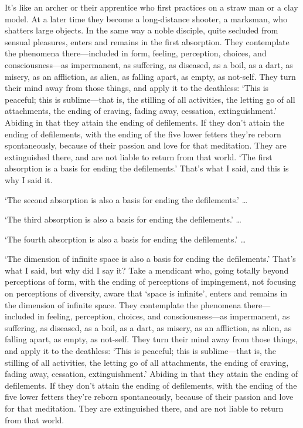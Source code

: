 \documentclass[12pt,openany]{book}%
\begin{document}
It’s like an archer or their apprentice who first practices on a straw man or a clay model. At a later time they become a long-distance shooter, a marksman, who shatters large objects. In the same way a noble disciple, quite secluded from sensual pleasures, enters and remains in the first absorption. They contemplate the phenomena there—included in form, feeling, perception, choices, and consciousness—as impermanent, as suffering, as diseased, as a boil, as a dart, as misery, as an affliction, as alien, as falling apart, as empty, as not-self. They turn their mind away from those things, and apply it to the deathless: ‘This is peaceful; this is sublime—that is, the stilling of all activities, the letting go of all attachments, the ending of craving, fading away, cessation, extinguishment.’ Abiding in that they attain the ending of defilements. If they don’t attain the ending of defilements, with the ending of the five lower fetters they’re reborn spontaneously, because of their passion and love for that meditation. They are extinguished there, and are not liable to return from that world. ‘The first absorption is a basis for ending the defilements.’ That’s what I said, and this is why I said it. 

‘The second absorption is also a basis for ending the defilements.’ … 

‘The third absorption is also a basis for ending the defilements.’ … 

‘The fourth absorption is also a basis for ending the defilements.’ … 

‘The dimension of infinite space is also a basis for ending the defilements.’ That’s what I said, but why did I say it? Take a mendicant who, going totally beyond perceptions of form, with the ending of perceptions of impingement, not focusing on perceptions of diversity, aware that ‘space is infinite’, enters and remains in the dimension of infinite space. They contemplate the phenomena there—included in feeling, perception, choices, and consciousness—as impermanent, as suffering, as diseased, as a boil, as a dart, as misery, as an affliction, as alien, as falling apart, as empty, as not-self. They turn their mind away from those things, and apply it to the deathless: ‘This is peaceful; this is sublime—that is, the stilling of all activities, the letting go of all attachments, the ending of craving, fading away, cessation, extinguishment.’ Abiding in that they attain the ending of defilements. If they don’t attain the ending of defilements, with the ending of the five lower fetters they’re reborn spontaneously, because of their passion and love for that meditation. They are extinguished there, and are not liable to return from that world. 
\end{document}
